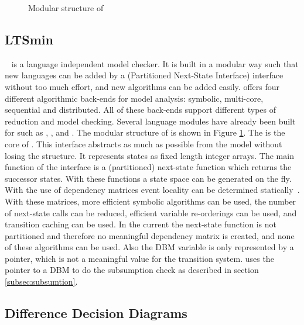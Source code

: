 \begin{figure}[h] 

\caption{Modular structure of \ltsmin{}}
\label{fig:pins_modern}
\end{figure}

\subsection{LTSmin}
\ltsmin{}~\cite{eemcs18152,ltsmin-mc:nmf2011} is a language independent model checker. It is built in a modular way such that new languages can be added by a \pins{} (Partitioned Next-State Interface) interface without too much effort, and new algorithms can be added easily. \ltsmin{} offers four different algorithmic back-ends for model analysis: symbolic, multi-core, sequential and distributed. All of these back-ends support different types of reduction and model checking. Several language modules have already been built for \ltsmin{} such as \mcrl{}, \promela{}, \dve{} and \uppaal{}. The modular structure of \ltsmin{} is shown in Figure \ref{fig:pins_modern}. The \pins{} is the core of \ltsmin{}. This interface abstracts as much as possible from the model without losing the structure. It represents states as fixed length integer arrays. The main function of the interface is a (partitioned) next-state function which returns the successor states. With these functions a state space can be generated on the fly. With the use of dependency matrices event locality can be determined statically~\cite{rwcmatrices}. With these matrices, more efficient symbolic algorithms can be used, the number of next-state calls can be reduced, efficient variable re-orderings can be used, and transition caching can be used. In the current \uppaal{} \pins{} the next-state function is not partitioned and therefore no meaningful dependency matrix is created, and none of these algorithms can be used. Also the DBM variable is only represented by a pointer, which is not a meaningful value for the transition system. \ltsmin{} uses the pointer to a DBM to do the subsumption check as described in section \ref{subsec:subsumtion}.

\subsection{Difference Decision Diagrams}

